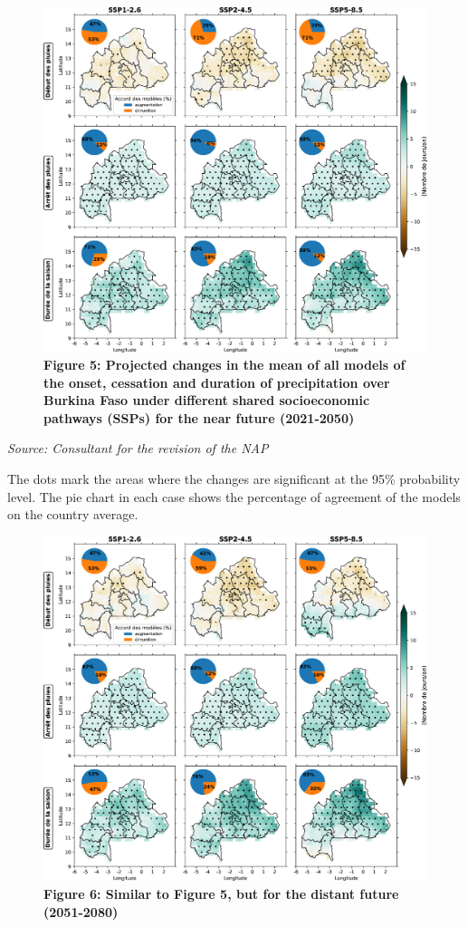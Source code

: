 \documentclass[
]{book}
\begin{document}
\begin{figure}
\centering
\includegraphics{Figures and Photos/Figure 5.png}
\caption{\textbf{Figure 5: Projected changes in the mean of all models of the onset, cessation and duration of precipitation over Burkina Faso under different shared socioeconomic pathways (SSPs) for the near future (2021-2050)}}
\end{figure}

\emph{Source: Consultant for the revision of the NAP}

The dots mark the areas where the changes are significant at the 95\% probability level. The pie chart in each case shows the percentage of agreement of the models on the country average.

\begin{figure}
\centering
\includegraphics{Figures and Photos/Figure 6.png}
\caption{\textbf{Figure 6: Similar to Figure 5, but for the distant future (2051-2080)}}
\end{figure}
\end{document}

